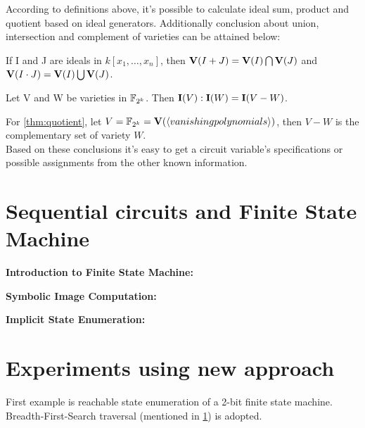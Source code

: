 According to definitions above, it's possible to calculate ideal sum, product and 
quotient based on ideal generators. Additionally conclusion about union, 
intersection and complement of varieties can be attained below: \par

\begin{Theorem}
\label{thm:unionintersect}
If I and J are ideals in $k[x_1, \dots, x_n]$, then ${\bf V}(I + J) = {\bf V}(I)
\bigcap {\bf V}(J)$ and ${\bf V}(I \cdot J) = {\bf V}(I) \bigcup {\bf V}(J)$.
\end{Theorem}

\begin{Theorem}
\label{thm:quotient}
Let V and W be varieties in ${\mathbb{F}}_{2^k}$. Then ${\bf I}(V) : {\bf I}(W) = 
{\bf I}(V - W)$.
\end{Theorem}

For \ref{thm:quotient}, let $V = {\mathbb{F}}_{2^k} = {\bf V}(\langle vanishing polynomials
\rangle)$, then $V - W$ is the complementary set of variety $W$.\\

Based on these conclusions it's easy to get a circuit variable's specifications
or possible assignments from the other known information.





\section{Sequential circuits and Finite State Machine}
\label{sec:fsm}
{\bf Introduction to Finite State Machine:}\par
{\bf Symbolic Image Computation:}\par
{\bf Implicit State Enumeration:}\par





\section{Experiments using new approach}
\label{sec:exp}

First example is reachable state enumeration of a 2-bit finite state machine.
Breadth-First-Search traversal (mentioned in \ref{sec:fsm}) is adopted.

